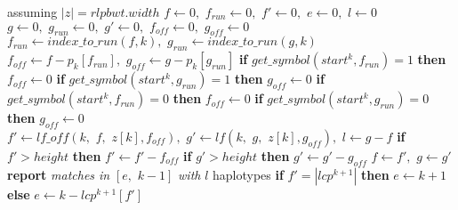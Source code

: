 \begin{algorithm}
  \footnotesize
  \begin{algorithmic}[1]
    \Comment assuming $|z|=rlpbwt.width$
    \State $f\gets 0,\,\,f_{run}\gets 0,\,\,f'\gets 0,\,\,e\gets 0,\,\,l\gets 0$
    \State $g\gets 0,\,\,g_{run}\gets 0,\,\,g'\gets 0,\,\,f_{off}\gets
    0,\,\,g_{off}\gets 0$ 
    \For {\textit{every} $k\in\left[0,\,\, |z|\right)$}
    \State $f_{run}\gets index\_to\_run(f,k),\,\,g_{run}\gets
    index\_to\_run(g,k)$
    \State $f_{off}\gets f-p_k[f_{run}],\,\,g_{off}\gets g-p_k[g_{run}]$
    \State \textbf{if} $get\_symbol(start^k, f_{run})=1$ \textbf{then}
    $f_{off}\gets 0$
    \State \textbf{if} $get\_symbol(start^k, g_{run})=1$ \textbf{then}
    $g_{off}\gets 0$ 
    \Else
    \State \textbf{if} $get\_symbol(start^k, f_{run})=0$ \textbf{then}
    $f_{off}\gets 0$
    \State \textbf{if} $get\_symbol(start^k, g_{run})=0$ \textbf{then}
    $g_{off}\gets 0$ 
    \EndIf
    \State $f'\gets lf\_off(k,\,\, f,\,\, z[k], f_{off}),\,\,g'\gets lf(k,\,\,
    g,\,\, z[k], g_{off}),\,\,l\gets g-f$
    \State \textbf{if} $f'>height$ \textbf{then} $f'\gets f'-f_{off}$
    \State \textbf{if} $g'>height$ \textbf{then} $g'\gets g'-g_{off}$
    \State $f\gets f',\,\,g\gets g'$
    \Else
    \State \textbf{report} \textit{matches in} $[e,\,\, k-1]$ \textit{with} $l$
    haplotypes   
    \EndIf
    \State \textbf{if} $f'=|lcp^{k+1}|$ \textbf{then} $e\gets k+1$ \textbf{else}
    $e\gets k-lcp^{k+1}[f']$ 
    

\end{algorithmic}
\end{algorithm}
